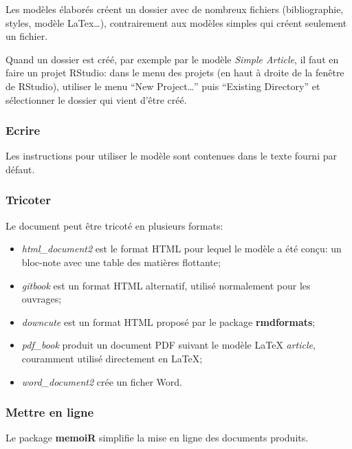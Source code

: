 \documentclass[
  12pt,
  french,
  a4paper,
  extrafontsizes,onecolumn,openright
  ]{memoir}
\providecommand{\tightlist}{%
  \setlength{\itemsep}{0pt}\setlength{\parskip}{0pt}}
\begin{document}
Les modèles élaborés créent un dossier avec de nombreux fichiers (bibliographie, styles, modèle LaTex\ldots), contrairement aux modèles simples qui créent seulement un fichier.

Quand un dossier est créé, par exemple par le modèle \emph{Simple Article}, il faut en faire un projet RStudio: dans le menu des projets (en haut à droite de la fenêtre de RStudio), utiliser le menu \enquote{New Project\ldots{}} puis \enquote{Existing Directory} et sélectionner le dossier qui vient d'être créé.

\hypertarget{ecrire-1}{%
\subsubsection{Ecrire}\label{ecrire-1}}

Les instructions pour utiliser le modèle sont contenues dans le texte fourni par défaut.

\hypertarget{tricoter}{%
\subsubsection{Tricoter}\label{tricoter}}

Le document peut être tricoté en plusieurs formats:

\begin{itemize}
\tightlist
\item
  \emph{html\_document2} est le format HTML pour lequel le modèle a été conçu: un bloc-note avec une table des matières flottante;
\item
  \emph{gitbook} est un format HTML alternatif, utilisé normalement pour les ouvrages;
\item
  \emph{downcute} est un format HTML proposé par le package \textbf{rmdformats};
\item
  \emph{pdf\_book} produit un document PDF suivant le modèle LaTeX \emph{article}, couramment utilisé directement en LaTeX;
\item
  \emph{word\_document2} crée un ficher Word.
\end{itemize}

\hypertarget{sec:article-en-ligne}{%
\subsubsection{Mettre en ligne}\label{sec:article-en-ligne}}

Le package \textbf{memoiR} simplifie la mise en ligne des documents produits.
\end{document}

